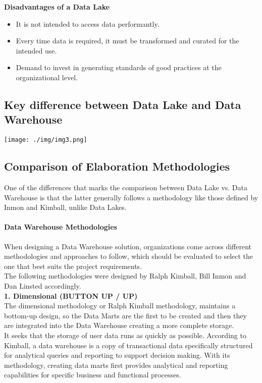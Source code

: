 \documentclass[twocolumn]{article}
\begin{document}
\textbf{\large Disadvantages of a Data Lake}
\begin{itemize}
    \item It is not intended to access data performantly.
    \item Every time data is required, it must be transformed and curated for the intended use.
    \item Demand to invest in generating standards of good practices at the organizational level.
\end{itemize}

\subsection{Key difference between Data Lake and Data Warehouse}
\begin{center}
    \texttt{[image: ./img/img3.png]}
\end{center}

\subsection{Comparison of Elaboration Methodologies}

\noindent One of the differences that marks the comparison between Data Lake vs. Data Warehouse is that the latter generally follows a methodology like those defined by Inmon and Kimball, unlike Data Lakes.

\paragraph{\Large Data Warehouse Methodologies \\[0.1in]}
When designing a Data Warehouse solution, organizations come across different methodologies and approaches to follow, which should be evaluated to select the one that best suits the project requirements.\\[0.1in]
The following methodologies were designed by Ralph Kimball, Bill Inmon and Dan Linsted accordingly.\\[0.1in]

\noindent\textbf{\large 1. Dimensional (BUTTON UP / UP)}\\[0.1in]
The dimensional methodology or Ralph Kimball methodology, maintains a bottom-up design, so the Data Marts are the first to be created and then they are integrated into the Data Warehouse creating a more complete storage.\\[0.1in]
It seeks that the storage of user data runs as quickly as possible. According to Kimball, a data warehouse is a copy of transactional data specifically structured for analytical queries and reporting to support decision making. With its methodology, creating data marts first provides analytical and reporting capabilities for specific business and functional processes.\\[0.1in]
\end{document}
